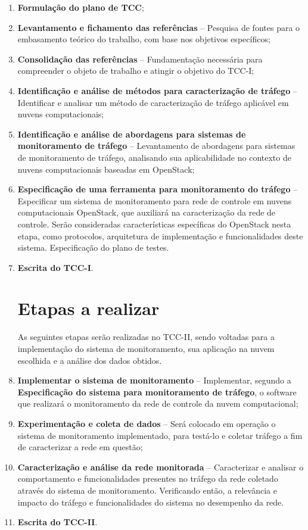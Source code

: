 \begin{enumerate}
	\item \textbf{Formulação do plano de TCC};
	\item \textbf{Levantamento e fichamento das referências} -- Pesquisa de fontes para o embasamento teórico do trabalho, com base nos objetivos específicos;
	\item \textbf{Consolidação das referências} -- Fundamentação necessária para compreender o objeto de trabalho e atingir o objetivo do TCC-I;
	\item \textbf{Identificação e análise de métodos para caracterização de tráfego} -- Identificar e analisar um método de caracterização de tráfego aplicável em nuvens computacionais;
	\item \textbf{Identificação e análise de abordagens para sistemas de monitoramento de tráfego} -- Levantamento de abordagens para sistemas de monitoramento de tráfego, analisando sua aplicabilidade no contexto de nuvens computacionais baseadas em OpenStack;
	\item \textbf{Especificação de uma ferramenta para monitoramento do tráfego} -- Especificar um sistema de monitoramento para rede de controle em nuvens computacionais OpenStack, que auxiliará na caracterização da rede de controle. 
	Serão consideradas características específicas do OpenStack nesta etapa, como protocolos, arquitetura de implementação e funcionalidades deste sistema.
	Especificação do plano de testes.
	\item \textbf{Escrita do TCC-I}.
    
    \section{Etapas a realizar}
    
As seguintes etapas serão realizadas no TCC-II, sendo voltadas para a implementação do sistema de monitoramento, sua aplicação na nuvem escolhida e a análise dos dados obtidos.
    
	\item \textbf{Implementar o sistema de monitoramento} -- Implementar, segundo a \textbf{Especificação do sistema para monitoramento de tráfego}, o software que realizará o monitoramento da rede de controle da nuvem computacional;
	\item \textbf{Experimentação e coleta de dados} -- Será colocado em operação o sistema de monitoramento implementado, para testá-lo e coletar tráfego a fim de caracterizar a rede em questão;
	\item \textbf{Caracterização e análise da rede monitorada} -- Caracterizar e analisar o comportamento e funcionalidades presentes no tráfego da rede coletado através do sistema de monitoramento. 
	Verificando então, a relevância e impacto do tráfego e funcionalidades do sistema no desempenho da rede.
	\item \textbf{Escrita do TCC-II}.
\end{enumerate}

